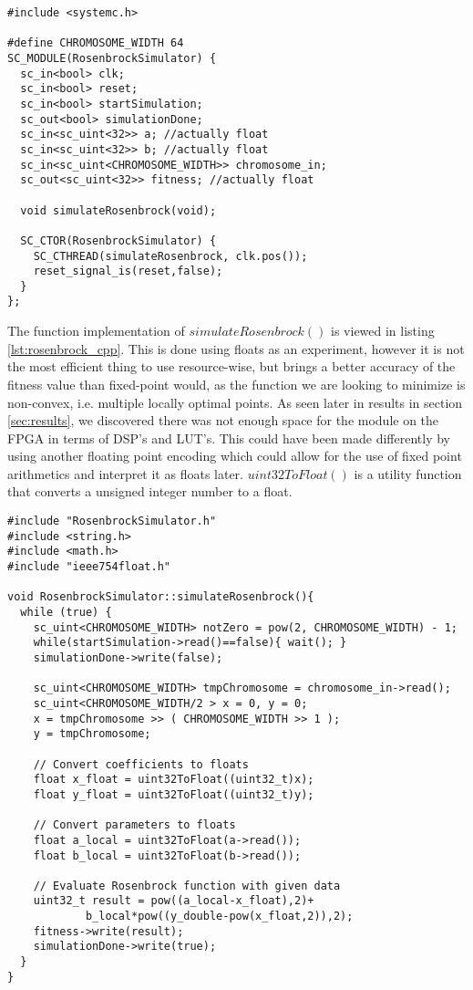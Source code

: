 \begin{lstlisting}[style=customc++,caption={RosenbrockSimulator.h},label={lst:rosenbrock_h}]
#include <systemc.h>

#define CHROMOSOME_WIDTH 64
SC_MODULE(RosenbrockSimulator) {
  sc_in<bool> clk;
  sc_in<bool> reset;
  sc_in<bool> startSimulation;
  sc_out<bool> simulationDone;
  sc_in<sc_uint<32>> a; //actually float
  sc_in<sc_uint<32>> b; //actually float
  sc_in<sc_uint<CHROMOSOME_WIDTH>> chromosome_in;
  sc_out<sc_uint<32>> fitness; //actually float

  void simulateRosenbrock(void);

  SC_CTOR(RosenbrockSimulator) {
    SC_CTHREAD(simulateRosenbrock, clk.pos());
    reset_signal_is(reset,false);
  }
};
\end{lstlisting}

The function implementation of $simulateRosenbrock()$ is viewed in listing \ref{lst:rosenbrock_cpp}. This is done using floats as an experiment, however it is not the most efficient thing to use resource-wise, but brings a better accuracy of the fitness value than fixed-point would, as the function we are looking to minimize is non-convex, i.e. multiple locally optimal points. As seen later in results in section \ref{sec:results}, we discovered there was not enough space for the module on the FPGA in terms of DSP's and LUT's. This could have been made differently by using another floating point encoding which could allow for the use of fixed point arithmetics and interpret it as floats later. $uint32ToFloat()$ is a utility function that converts a unsigned integer number to a float.

\begin{lstlisting}[style=customc++,caption={RosenbrockSimulator.cpp},label={lst:rosenbrock_cpp}]
#include "RosenbrockSimulator.h"
#include <string.h>
#include <math.h>
#include "ieee754float.h"

void RosenbrockSimulator::simulateRosenbrock(){
  while (true) {
    sc_uint<CHROMOSOME_WIDTH> notZero = pow(2, CHROMOSOME_WIDTH) - 1;
    while(startSimulation->read()==false){ wait(); }
    simulationDone->write(false);
    
    sc_uint<CHROMOSOME_WIDTH> tmpChromosome = chromosome_in->read();
    sc_uint<CHROMOSOME_WIDTH/2 > x = 0, y = 0;
    x = tmpChromosome >> ( CHROMOSOME_WIDTH >> 1 );
    y = tmpChromosome;
    
    // Convert coefficients to floats
    float x_float = uint32ToFloat((uint32_t)x);
   	float y_float = uint32ToFloat((uint32_t)y);
   	
   	// Convert parameters to floats
   	float a_local = uint32ToFloat(a->read());
   	float b_local = uint32ToFloat(b->read());
   
   	// Evaluate Rosenbrock function with given data
    uint32_t result = pow((a_local-x_float),2)+
    		b_local*pow((y_double-pow(x_float,2)),2);
    fitness->write(result);
    simulationDone->write(true);
  }
}
\end{lstlisting}


